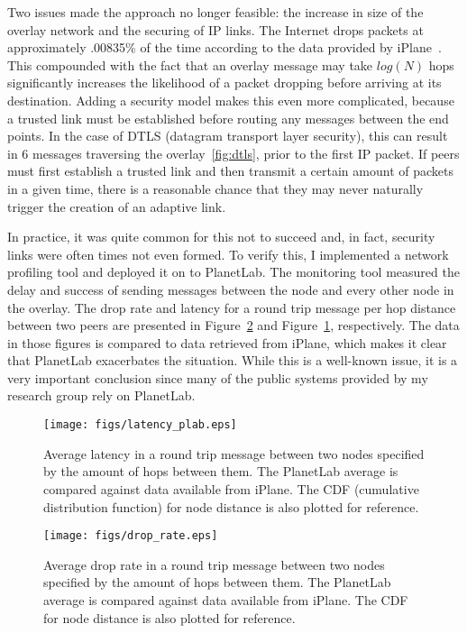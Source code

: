 Two issues made the approach no longer feasible:  the increase in size of the
overlay network and the securing of IP links.  The Internet drops packets at
approximately .00835\% of the time according to the data provided by
iPlane~\cite{iplane}.  This compounded with the fact that an overlay message
may take $log(N)$ hops significantly increases the likelihood of a packet
dropping before arriving at its destination.  Adding a security model makes
this even more complicated, because a trusted link must be established before
routing any messages between the end points.  In the case of DTLS (datagram
transport layer security), this can result in 6 messages traversing the
overlay~\ref{fig:dtls}, prior to the first IP packet.  If peers must first
establish a trusted link and then transmit a certain amount of packets in a
given time, there is a reasonable chance that they may never naturally trigger
the creation of an adaptive link.

In practice, it was quite common for this not to succeed and, in fact, security
links were often times not even formed.  To verify this, I implemented a
network profiling tool and deployed it on to PlanetLab.  The monitoring tool
measured the delay and success of sending messages between the node and every
other node in the overlay.  The drop rate and latency for a round trip message
per hop distance between two peers are presented in
Figure~\ref{fig:drop_rate_plab} and Figure~\ref{fig:latency_plab},
respectively.  The data in those figures is compared to data retrieved from
iPlane, which makes it clear that PlanetLab exacerbates the situation.  While
this is a well-known issue, it is a very important conclusion since many of the
public systems provided by my research group rely on PlanetLab.

\begin{figure}
\centering
\texttt{[image: figs/latency\_plab.eps]}
\caption[Latency in PlanetLab deployment]{Average latency in a round trip
message between two nodes specified by the amount of hops between them.  The
PlanetLab average is compared against data available from iPlane.  The CDF
(cumulative distribution function) for node distance is also plotted for
reference.}
\label{fig:latency_plab}
\end{figure}

\begin{figure}
\centering
\texttt{[image: figs/drop\_rate.eps]}
\caption[Drop rate in PlanetLab deployment]{Average drop rate in a round trip
message between two nodes specified by the amount of hops between them.  The
PlanetLab average is compared against data available from iPlane.  The CDF for
node distance is also plotted for reference.}
\label{fig:drop_rate_plab}
\end{figure}


